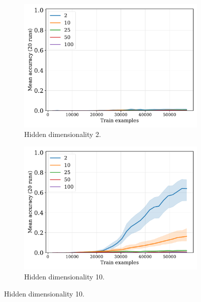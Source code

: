 \begin{figure}[H]
  \centering

  \begin{subfigure}{0.45\linewidth}
    \includegraphics[width=1\textwidth]{../fig/fuzzy-lm-vocab20-pretrain-3tasks-train_size-embed_dim-hidden_dim=2.pdf}
    \caption{Hidden dimensionality 2.}
  \end{subfigure}
  \hfill
  \begin{subfigure}{0.45\linewidth}
    \includegraphics[width=1\textwidth]{../fig/fuzzy-lm-vocab20-pretrain-3tasks-train_size-embed_dim-hidden_dim=10.pdf}
    \caption{Hidden dimensionality 10.}
  \end{subfigure}

  \vspace{24pt}


\end{figure}
